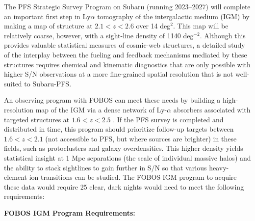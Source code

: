 \documentclass[11pt,a4paper,twoside,onecolumn,openany,final,oldfontcommands]{memoir}
\begin{document}

The PFS Strategic Survey Program on Subaru (running 2023--2027) \citep{Nagamine:2020_tomography} will complete an important first step in Ly$\alpha$ tomography of the intergalactic medium (IGM) by making a map of structure at $2.1 < z < 2.6$ over 14 deg$^2$.  This map will be relatively coarse, however, with a sight-line density of 1140 deg$^{-2}$.  Although this provides valuable statistical measures of cosmic-web structures, a detailed study of the interplay between the fueling and feedback mechanisms mediated by these structures requires chemical and kinematic diagnostics that are only possible with higher S/N observations at a more fine-grained spatial resolution that is not well-suited to Subaru-PFS.


An observing program with FOBOS can meet these needs by building a high-resolution map of the IGM via a dense network of Ly-$\alpha$ absorbers associated with targeted structures at $1.6 < z < 2.5$ \citep[see][]{lee16}.  If the PFS survey is completed and distributed in time, this program should prioritize follow-up targets between $1.6 < z < 2.1$ (not accessible to PFS, but where sources are brighter) in these fields, such as protoclusters and galaxy overdensities.  This higher density yields statistical insight at 1 Mpc separations (the scale of individual massive halos) and the ability to stack sightlines to gain further in S/N so that various heavy-element ion transitions can be studied.  The FOBOS IGM program to acquire these data would require 25 clear, dark nights would need to meet the following requirements:


\noindent \textbf{FOBOS IGM Program Requirements:}
\end{document}
